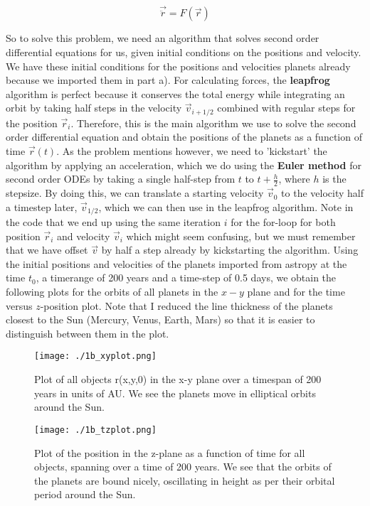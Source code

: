\begin{equation}
 \vec{\ddot{r}} = F(\vec{r})
\end{equation}

So to solve this problem, we need an algorithm that solves second order differential equations for us, given initial conditions on the positions and velocity. We have these initial conditions for the positions and velocities planets already because we imported them in part a). For calculating forces, the \textbf{leapfrog} algorithm is perfect because it conserves the total energy while integrating an orbit by taking half steps in the velocity $\vec{v}_{i+1/2}$ combined with regular steps for the position $\vec{r}_i$. Therefore, this is the main algorithm we use to solve the second order differential equation and obtain the positions of the planets as a function of time $\vec{r}(t)$. As the problem mentions however, we need to 'kickstart' the algorithm by applying an acceleration, which we do using the \textbf{Euler method} for second order ODEs by taking a single half-step from $t$ to $t + \frac{h}{2}$, where $h$ is the stepsize. By doing this, we can translate a starting velocity $\vec{v}_0$ to the velocity half a timestep later, $\vec{v}_{1/2}$, which we can then use in the leapfrog algorithm. Note in the code that we end up using the same iteration $i$ for the for-loop for both position $\vec{r}_i$ and velocity $\vec{v}_i$ which might seem confusing, but we must remember that we have offset $\vec{v}$ by half a step already by kickstarting the algorithm. Using the initial positions and velocities of the planets imported from astropy at the time $t_0$, a timerange of 200 years and a time-step of 0.5 days, we obtain the following plots for the orbits of all planets in the $x-y$ plane and for the time versus $z$-position plot. Note that I reduced the line thickness of the planets closest to the Sun (Mercury, Venus, Earth, Mars) so that it is easier to distinguish between them in the plot. 

\begin{figure}[h!]
  \centering
  \texttt{[image: ./1b\_xyplot.png]}
  \caption{Plot of all objects r(x,y,0) in the x-y plane over a timespan of 200 years in units of AU. We see the planets move in elliptical orbits around the Sun.}
\end{figure}

\begin{figure}[h!]
  \centering
  \texttt{[image: ./1b\_tzplot.png]}
  \caption{Plot of the position in the z-plane as a function of time for all objects, spanning over a time of 200 years. We see that the orbits of the planets are bound nicely, oscillating in height as per their orbital period around the Sun.}
\end{figure}

